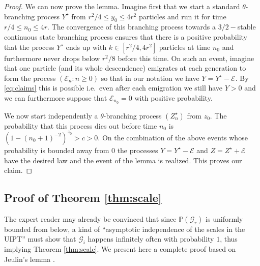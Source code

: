 \documentclass[AHL,XML,longabstracts,Unicode,NoSaveZebib]{cedram}
\begin{document}
\begin{proof}
We can now prove the lemma. Imagine first that we start a standard $\theta$-branching process ${Y}^{\star}$ from $ r^{2}/4 \leq y_{0} \leq 4 r^{2}$ particles and run it for time $ r/4 \leq n_{0} \leq 4r$. The convergence of this branching process towards a $3/2-$stable continuous state branching process ensures that there is a positive probability that the process $Y^\star$ ends up with $ k \in [r^{2}/4,4r^{2}]$ particles at time $n_0$ and furthermore never drops below $r^{2}/8$ before this time. On such an event, imagine that one particle (and its whole descendence) emigrates at each generation to form the process $(\mathcal{E}_{n} : n \geq 0)$ so that in our notation we have $Y = Y^{\star}-\mathcal{E}$.  By \eqref{eq:claims} this is possible i.e.~even after each emigration we still have $Y>0$ and we can furthermore suppose that $ \mathcal{E}_{n_{0}}=0$ with positive probability.

We now start independently a $\theta$-branching process $(Z_{n}^{\star})$ from $z_{0}$. The probability that this process dies out before time $n_{0}$ is $ (1- (n_{0}+1)^{-2})^{z_{0}} > c >0$. On the combination of the above events whose probability is bounded away from $0$ the processes $Y = Y^{\star}-\mathcal{E}$ and $Z = Z^{\star}+ \mathcal{E}$ have the desired law and the event of the lemma is realized. This proves our claim.
\end{proof}


\subsection{Proof of Theorem \ref{thm:scale}}
The expert reader may already be convinced that since $ \mathbb{P}( \mathcal{G}_{r})$ is uniformly bounded from below,  a kind of ``asymptotic independence of the scales in the UIPT'' must show that  $ \mathcal{G}_{i}$ happens infinitely often with probability $1$, thus implying Theorem \ref{thm:scale}. We present here a complete proof based on Jeulin's lemma \cite{Jeu82}.
\end{document}
